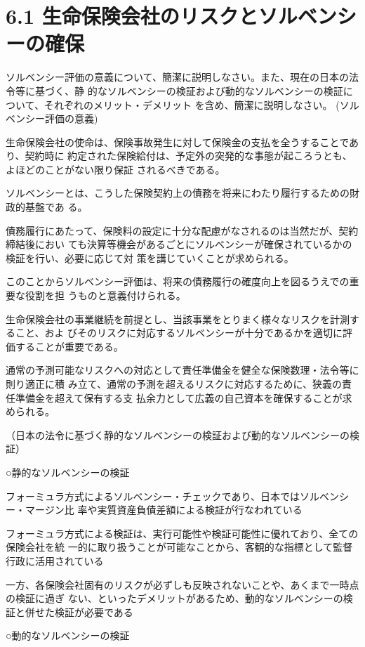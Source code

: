 \documentclass[report,gutter=10mm,fore-edge=10mm,uplatex,dvipdfmx]{jlreq}
\begin{document}
\section{6.1 生命保険会社のリスクとソルベンシーの確保}
ソルベンシー評価の意義について、簡潔に説明しなさい。また、現在の日本の法令等に基づく、静
的なソルベンシーの検証および動的なソルベンシーの検証について、それぞれのメリット・デメリット
を含め、簡潔に説明しなさい。
\answer{}
(ソルベンシー評価の意義)

 生命保険会社の使命は、保険事故発生に対して保険金の支払を全うすることであり、契約時に
約定された保険給付は、予定外の突発的な事態が起ころうとも、よほどのことがない限り保証
されるべきである。

 ソルベンシーとは、こうした保険契約上の債務を将来にわたり履行するための財政的基盤であ
る。

 債務履行にあたって、保険料の設定に十分な配慮がなされるのは当然だが、契約締結後におい
ても決算等機会があるごとにソルベンシーが確保されているかの検証を行い、必要に応じて対
策を講じていくことが求められる。

 このことからソルベンシー評価は、将来の債務履行の確度向上を図るうえでの重要な役割を担
うものと意義付けられる。

 生命保険会社の事業継続を前提とし、当該事業をとりまく様々なリスクを計測すること、およ
びそのリスクに対応するソルベンシーが十分であるかを適切に評価することが重要である。

 通常の予測可能なリスクへの対応として責任準備金を健全な保険数理・法令等に則り適正に積
み立て、通常の予測を超えるリスクに対応するために、狭義の責任準備金を超えて保有する支
払余力として広義の自己資本を確保することが求められる。


（日本の法令に基づく静的なソルベンシーの検証および動的なソルベンシーの検証）

○静的なソルベンシーの検証

 フォーミュラ方式によるソルベンシー・チェックであり、日本ではソルベンシー・マージン比
率や実質資産負債差額による検証が行なわれている

 フォーミュラ方式による検証は、実行可能性や検証可能性に優れており、全ての保険会社を統
一的に取り扱うことが可能なことから、客観的な指標として監督行政に活用されている

 一方、各保険会社固有のリスクが必ずしも反映されないことや、あくまで一時点の検証に過ぎ
ない、といったデメリットがあるため、動的なソルベンシーの検証と併せた検証が必要である

○動的なソルベンシーの検証
\end{document}
